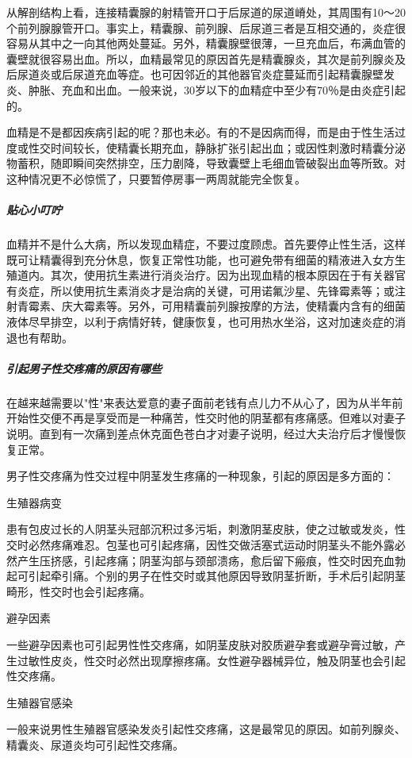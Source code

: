 从解剖结构上看，连接精囊腺的射精管开口于后尿道的尿道嵴处，其周围有10～20个前列腺腺管开口。事实上，精囊腺、前列腺、后尿道三者是互相交通的，炎症很容易从其中之一向其他两处蔓延。另外，精囊腺壁很薄，一旦充血后，布满血管的囊壁就很容易出血。所以，血精最常见的原因首先是精囊腺炎，其次是前列腺炎及后尿道炎或后尿道充血等症。也可因邻近的其他器官炎症蔓延而引起精囊腺壁发炎、肿胀、充血和出血。一般来说，30岁以下的血精症中至少有70％是由炎症引起的。

血精是不是都因疾病引起的呢？那也未必。有的不是因病而得，而是由于性生活过度或性交时间较长，使精囊长期充血，静脉扩张引起出血；或因性刺激时精囊分泌物蓄积，随即瞬间突然排空，压力剧降，导致囊壁上毛细血管破裂出血等所致。对这种情况更不必惊慌了，只要暂停房事一两周就能完全恢复。

\subparagraph{贴心小叮咛}

血精并不是什么大病，所以发现血精症，不要过度顾虑。首先要停止性生活，这样既可让精囊得到充分休息，恢复正常性功能，也可避免带有细菌的精液进入女方生殖道内。其次，使用抗生素进行消炎治疗。因为出现血精的根本原因在于有关器官有炎症，所以使用抗生素消炎才是治病的关键，可用诺氟沙星、先锋霉素等；或注射青霉素、庆大霉素等。另外，可用精囊前列腺按摩的方法，使精囊内含有的细菌液体尽早排空，以利于病情好转，健康恢复，也可用热水坐浴，这对加速炎症的消退也有帮助。

\subparagraph{引起男子性交疼痛的原因有哪些}

在越来越需要以"性"来表达爱意的妻子面前老钱有点儿力不从心了，因为从半年前开始性交便不再是享受而是一种痛苦，性交时他的阴茎都有疼痛感。但难以对妻子说明。直到有一次痛到差点休克面色苍白才对妻子说明，经过大夫治疗后才慢慢恢复正常。

男子性交疼痛为性交过程中阴茎发生疼痛的一种现象，引起的原因是多方面的：

生殖器病变

患有包皮过长的人阴茎头冠部沉积过多污垢，刺激阴茎皮肤，使之过敏或发炎，性交时必然疼痛难忍。包茎也可引起疼痛，因性交做活塞式运动时阴茎头不能外露必然产生压挤感，引起疼痛；阴茎沟部与颈部溃疡，愈后留下瘢痕，性交时因充血勃起可引起牵引痛。个别的男子在性交时或其他原因导致阴茎折断，手术后引起阴茎畸形，性交时也会引起疼痛。

避孕因素

一些避孕因素也可引起男性性交疼痛，如阴茎皮肤对胶质避孕套或避孕膏过敏，产生过敏性皮炎，性交时必然出现摩擦疼痛。女性避孕器械异位，触及阴茎也会引起性交疼痛。

生殖器官感染

一般来说男性生殖器官感染发炎引起性交疼痛，这是最常见的原因。如前列腺炎、精囊炎、尿道炎均可引起性交疼痛。

